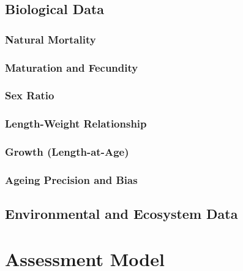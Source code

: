 \documentclass[11pt,
  english,
  letterpaper,
]{article}
\begin{document}
\hypertarget{biological-data}{%
\subsection{Biological Data}\label{biological-data}}

\hypertarget{natural-mortality}{%
\subsubsection{Natural Mortality}\label{natural-mortality}}

\hypertarget{maturation-and-fecundity}{%
\subsubsection{Maturation and Fecundity}\label{maturation-and-fecundity}}

\hypertarget{sex-ratio}{%
\subsubsection{Sex Ratio}\label{sex-ratio}}

\hypertarget{length-weight-relationship}{%
\subsubsection{Length-Weight Relationship}\label{length-weight-relationship}}

\hypertarget{growth-length-at-age}{%
\subsubsection{Growth (Length-at-Age)}\label{growth-length-at-age}}

\hypertarget{ageing-precision-and-bias}{%
\subsubsection{Ageing Precision and Bias}\label{ageing-precision-and-bias}}

\hypertarget{environmental-and-ecosystem-data}{%
\subsection{Environmental and Ecosystem Data}\label{environmental-and-ecosystem-data}}

\hypertarget{assessment-model}{%
\section{Assessment Model}\label{assessment-model}}
\end{document}
